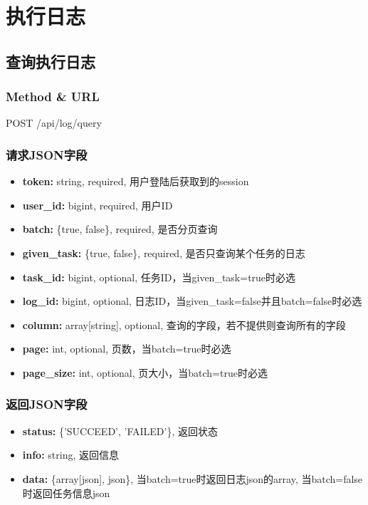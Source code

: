 ﻿\documentclass[a4paper]{report}
\begin{document}
\section{执行日志} %
\subsection{查询执行日志} %
\subsubsection{Method \& URL} %
POST /api/log/query

\subsubsection{请求JSON字段}
\begin{itemize}
	\item \textbf{token:} string, required, 用户登陆后获取到的session
	\item \textbf{user\_id:} bigint, required, 用户ID
	\item \textbf{batch:} \{true, false\}, required, 是否分页查询
	\item \textbf{given\_task:} \{true, false\}, required, 是否只查询某个任务的日志
	\item \textbf{task\_id:} bigint, optional, 任务ID，当given\_task=true时必选
	\item \textbf{log\_id:} bigint, optional, 日志ID，当given\_task=false并且batch=false时必选
	\item \textbf{column:} array[string], optional, 查询的字段，若不提供则查询所有的字段
	\item \textbf{page:} int, optional, 页数，当batch=true时必选
	\item \textbf{page\_size:} int, optional, 页大小，当batch=true时必选
\end{itemize}

\subsubsection{返回JSON字段}
\begin{itemize}
	\item \textbf{status:} \{'SUCCEED', 'FAILED'\}, 返回状态
	\item \textbf{info:} string, 返回信息
	\item \textbf{data:} \{array[json], json\}, 当batch=true时返回日志json的array, 当batch=false时返回任务信息json
\end{itemize}
\end{document}
